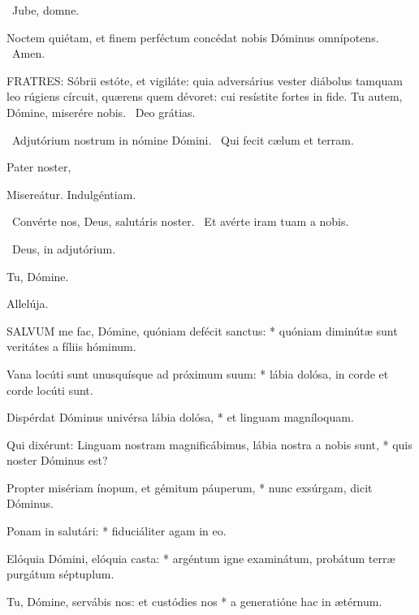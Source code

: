 

\sectionornament


\V\ Jube, domne.

 Noctem quiétam, et finem perféctum concédat nobis Dóminus omnípotens. \R\ Amen.


\lettrine[lines=2]{F}{RATRES}: Sóbrii estóte, et vigiláte: quia adversárius vester diábolus tamquam leo rúgiens círcuit, quærens quem dévoret: cui resístite fortes in fide. Tu autem, Dómine, miserére nobis. \R\ Deo grátias.

\V\ Adjutórium nostrum in nómine Dómini. \R\ Qui fecit cælum et terram.

Pater noster, 

 Misereátur. Indulgéntiam.

\V\ Convérte nos, Deus, salutáris noster. \R\ Et avérte iram tuam a nobis.

\V\ Deus, in adjutórium.


 Tu, Dómine.


 Allelúja.


\lettrine[lines=2]{S}{ALVUM} me fac, Dómine, quóniam defécit sanctus: * quóniam diminútæ sunt veritátes a fíliis hóminum.

Vana locúti sunt unusquísque ad próximum suum: * lábia dolósa, in corde et corde locúti sunt.

Dispérdat Dóminus univérsa lábia dolósa, * et linguam magníloquam.

Qui dixérunt: Linguam nostram magnificábimus, lábia nostra a nobis sunt, * quis noster Dóminus est?

Propter misériam ínopum, et gémitum páuperum, * nunc exsúrgam, dicit Dóminus.

Ponam in salutári: * fiduciáliter agam in eo.

Elóquia Dómini, elóquia casta: * argéntum igne examinátum, probátum terræ purgátum séptuplum.

Tu, Dómine, servábis nos: et custódies nos * a generatióne hac in ætérnum.


